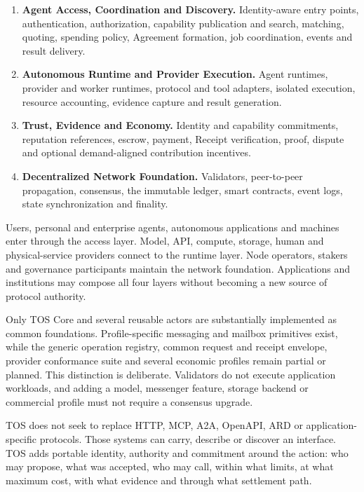 \documentclass[11pt,oneside]{article}
\begin{document}
\begin{enumerate}
  \item \textbf{Agent Access, Coordination and Discovery.} Identity-aware entry points,
        authentication, authorization, capability publication and search, matching, quoting,
        spending policy, Agreement formation, job coordination, events and result delivery.
  \item \textbf{Autonomous Runtime and Provider Execution.} Agent runtimes, provider and
        worker runtimes, protocol and tool adapters, isolated execution, resource accounting,
        evidence capture and result generation.
  \item \textbf{Trust, Evidence and Economy.} Identity and capability commitments,
        reputation references, escrow, payment, Receipt verification, proof, dispute and
        optional demand-aligned contribution incentives.
  \item \textbf{Decentralized Network Foundation.} Validators, peer-to-peer propagation,
        consensus, the immutable ledger, smart contracts, event logs, state synchronization
        and finality.
\end{enumerate}

Users, personal and enterprise agents, autonomous applications and machines enter through the
access layer. Model, API, compute, storage, human and physical-service providers connect to
the runtime layer. Node operators, stakers and governance participants maintain the network
foundation. Applications and institutions may compose all four layers without becoming a
new source of protocol authority.

Only TOS Core and several reusable actors are substantially implemented as common foundations.
Profile-specific messaging and mailbox primitives exist, while the generic operation
registry, common request and receipt envelope, provider conformance suite and several economic
profiles remain partial or planned. This distinction is deliberate. Validators do not execute
application workloads, and adding a model, messenger feature, storage backend or commercial
profile must not require a consensus upgrade.

TOS does not seek to replace HTTP, MCP, A2A, OpenAPI, ARD or application-specific protocols.
Those systems can carry, describe or discover an interface. TOS adds portable identity,
authority and commitment around the action: who may propose, what was accepted, who may call,
within what limits, at what maximum cost, with what evidence and through what settlement path.
\end{document}
